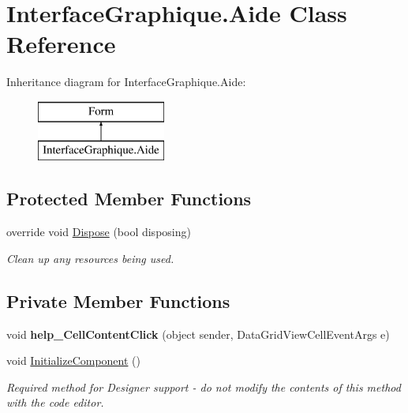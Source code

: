 \hypertarget{class_interface_graphique_1_1_aide}{}\section{Interface\+Graphique.\+Aide Class Reference}
\label{class_interface_graphique_1_1_aide}
Inheritance diagram for Interface\+Graphique.\+Aide\+:\begin{figure}[H]
\begin{center}
\leavevmode
\includegraphics[height=2.000000cm]{class_interface_graphique_1_1_aide}
\end{center}
\end{figure}
\subsection*{Protected Member Functions}
\begin{DoxyCompactItemize}
\item 
override void \hyperlink{class_interface_graphique_1_1_aide_a38ca3f1e4bf62e0bad97bcc10a606e94}{Dispose} (bool disposing)
\begin{DoxyCompactList}\small\item\em Clean up any resources being used. \end{DoxyCompactList}\end{DoxyCompactItemize}
\subsection*{Private Member Functions}
\begin{DoxyCompactItemize}
\item 
void {\bfseries help\+\_\+\+Cell\+Content\+Click} (object sender, Data\+Grid\+View\+Cell\+Event\+Args e)\hypertarget{class_interface_graphique_1_1_aide_a48e4e78e863790eb4eda762164cda463}{}\label{class_interface_graphique_1_1_aide_a48e4e78e863790eb4eda762164cda463}

\item 
void \hyperlink{class_interface_graphique_1_1_aide_a9d52f70fb7edc63fd253921c59f8d077}{Initialize\+Component} ()
\begin{DoxyCompactList}\small\item\em Required method for Designer support -\/ do not modify the contents of this method with the code editor. \end{DoxyCompactList}\end{DoxyCompactItemize}
